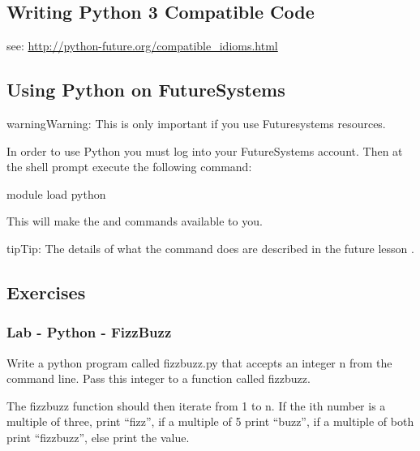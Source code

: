 \subsection{Writing Python 3 Compatible Code}
\label{\detokenize{lesson/prg/python_intro:writing-python-3-compatible-code}}
see: \url{http://python-future.org/compatible\_idioms.html}


\subsection{Using Python on FutureSystems}
\label{\detokenize{lesson/prg/python_intro:using-python-on-futuresystems}}
\begin{sphinxadmonition}{warning}{Warning:}
This is only important if you use Futuresystems resources.
\end{sphinxadmonition}

In order to use Python you must log into your FutureSystems account.
Then at the shell prompt execute the following command:

\begin{sphinxVerbatim}[commandchars=\\\{\}]
\PYGZdl{} module load python
\end{sphinxVerbatim}

This will make the  and  commands available to
you.

\begin{sphinxadmonition}{tip}{Tip:}
The details of what the  command does are described
in the future lesson .
\end{sphinxadmonition}


\subsection{Exercises}
\label{\detokenize{lesson/prg/python_intro:exercises}}

\subsubsection{Lab - Python - FizzBuzz}
\label{\detokenize{lesson/prg/python_intro:lab-python-1}}\label{\detokenize{lesson/prg/python_intro:lab-python-fizzbuzz}}
Write a python program called fizzbuzz.py that accepts an integer n
from the command line.  Pass this integer to a function called
fizzbuzz.

The fizzbuzz function should then iterate from 1 to n.  If the ith
number is a multiple of three, print ``fizz'', if a multiple of 5 print
``buzz'', if a multiple of both print ``fizzbuzz'', else print the value.


